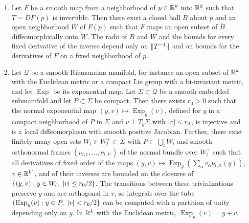 \begin{lemma}\label{ch27:lem:smooth-charts}
\begin{enumerate}
\item Let $F$ be a smooth map from a neighborhood of $p\in\mathbb R^k$ into $\mathbb R^k$ such that $T=DF(p)$ is invertible. Then there exist a closed ball $\overline B$ about $p$ and an open neighborhood $W$ of $F(p)$ such that $F$ maps an open subset of $\overline B$ diffeomorphically onto $W$. The radii of $\overline B$ and $W$ and the bounds for every fixed derivative of the inverse depend only on $\lVert T^{-1}\rVert$ and on bounds for the derivatives of $F$ on a fixed neighborhood of $p$.
\item Let $\mathcal Q$ be a smooth Riemannian manifold, for instance an open subset of $\mathbb R^k$ with the Euclidean metric or a compact Lie group with a bi-invariant metric, and let $\operatorname{Exp}$ be its exponential map. Let $\Sigma\subset\mathcal Q$ be a smooth embedded submanifold and let $P\subset\Sigma$ be compact. Then there exists $r_0>0$ such that the normal exponential map $(y,v)\mapsto\operatorname{Exp}_y(v)$, defined for $y$ in a compact neighborhood of $P$ in $\Sigma$ and $v\perp T_y\Sigma$ with $\lvert v\rvert<r_0$, is injective and is a local diffeomorphism with smooth positive Jacobian. Further, there exist finitely many open sets $W_l\Subset W_l^+\subset\Sigma$ with $P\subset\bigcup_lW_l$ and smooth orthonormal frames $(\nu_{l,1},\dots,\nu_{l,k'})$ of the normal bundle over $W_l^+$ such that all derivatives of fixed order of the maps $(y,v)\mapsto\operatorname{Exp}_y(\sum_\alpha v_\alpha\nu_{l,\alpha}(y))$, $v\in\mathbb R^{k'}$, and of their inverses are bounded on the closures of $\{(y,v):y\in W_l,\ \lvert v\rvert\le r_0/2\}$. The transitions between these trivializations preserve $y$ and are orthogonal in $v$, so integrals over the tube $\{\operatorname{Exp}_y(v):y\in P,\ \lvert v\rvert<r_0/2\}$ can be computed with a partition of unity depending only on $y$. In $\mathbb R^k$ with the Euclidean metric, $\operatorname{Exp}_y(v)=y+v$.
\end{enumerate}
\end{lemma}

